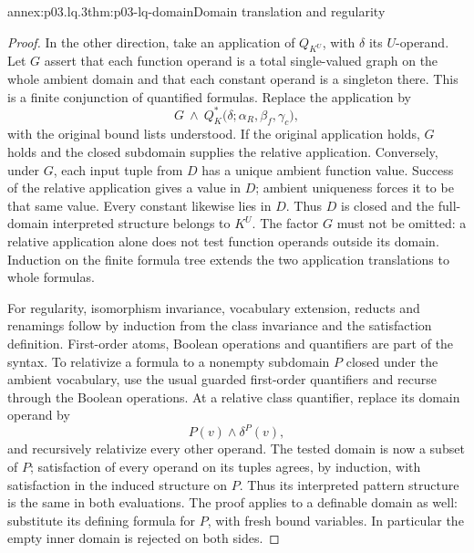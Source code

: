 \begin{annexitem}{annex:p03.lq.3}{thm:p03-lq-domain}{Domain translation and regularity}
\begin{proof}
In the other direction, take an application of \(Q_{K^U}\), with
\(\delta\) its \(U\)-operand. Let \(G\) assert that each function
operand is a total single-valued graph on the whole ambient domain
and that each constant operand is a singleton there. This is a
finite conjunction of quantified formulas. Replace the application by
\[
 G\ \land\ Q_K^*\bigl(\delta;\alpha_R,\beta_f,\gamma_c\bigr),
\]
with the original bound lists understood. If the original application
holds, \(G\) holds and the closed subdomain supplies the relative
application. Conversely, under \(G\), each input tuple from \(D\)
has a unique ambient function value. Success of the relative
application gives a value in \(D\); ambient uniqueness forces it
to be that same value. Every constant likewise lies in \(D\).
Thus \(D\) is closed and the full-domain interpreted structure
belongs to \(K^U\). The factor \(G\) must not be omitted: a
relative application alone does not test function operands outside
its domain. Induction on the finite formula tree extends the two
application translations to whole formulas.

For regularity, isomorphism invariance, vocabulary extension, reducts
and renamings follow by induction from the class invariance and the
satisfaction definition. First-order atoms, Boolean operations and
quantifiers are part of the syntax. To relativize a formula to a
nonempty subdomain \(P\) closed under the ambient vocabulary, use
the usual guarded first-order quantifiers and recurse through the
Boolean operations. At a relative class quantifier, replace its
domain operand by
\[
 P(v)\land\delta^P(v),
\]
and recursively relativize every other operand. The tested domain
is now a subset of \(P\); satisfaction of every operand on its
tuples agrees, by induction, with satisfaction in the induced
structure on \(P\). Thus its interpreted pattern structure is
the same in both evaluations. The proof applies to a definable
domain as well: substitute its defining formula for \(P\), with
fresh bound variables. In particular the empty inner domain is
rejected on both sides.


\end{proof}
\end{annexitem}
